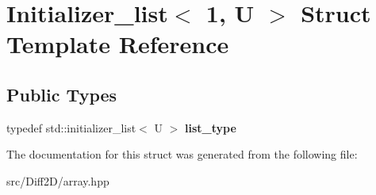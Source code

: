 \hypertarget{structInitializer__list_3_011_00_01U_01_4}{\section{Initializer\-\_\-list$<$ 1, U $>$ Struct Template Reference}
\label{structInitializer__list_3_011_00_01U_01_4}
}
\subsection*{Public Types}
\begin{DoxyCompactItemize}
\item 
\hypertarget{structInitializer__list_3_011_00_01U_01_4_a84155c0e2c82ce1298dfa8ae00c670c6}{typedef std\-::initializer\-\_\-list$<$ U $>$ {\bfseries list\-\_\-type}}\label{structInitializer__list_3_011_00_01U_01_4_a84155c0e2c82ce1298dfa8ae00c670c6}

\end{DoxyCompactItemize}


The documentation for this struct was generated from the following file\-:\begin{DoxyCompactItemize}
\item 
src/\-Diff2\-D/array.\-hpp\end{DoxyCompactItemize}
